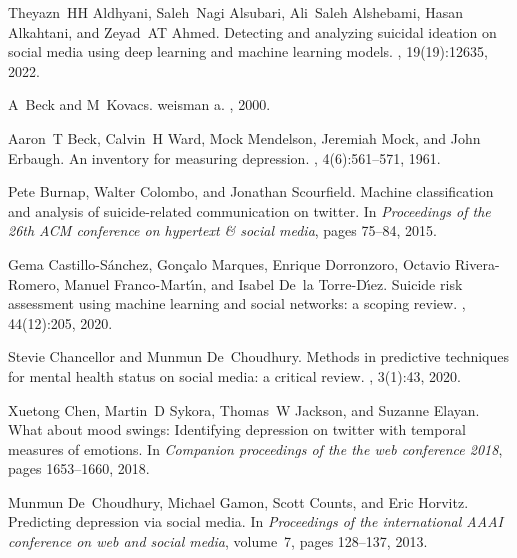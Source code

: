 \begin{thebibliography}{10}

Theyazn~HH Aldhyani, Saleh~Nagi Alsubari, Ali~Saleh Alshebami, Hasan Alkahtani,
  and Zeyad~AT Ahmed.
\newblock Detecting and analyzing suicidal ideation on social media using deep
  learning and machine learning models.
, 19(19):12635, 2022.

A~Beck and M~Kovacs.
\newblock weisman a.
, 2000.

Aaron~T Beck, Calvin~H Ward, Mock Mendelson, Jeremiah Mock, and John Erbaugh.
\newblock An inventory for measuring depression.
, 4(6):561--571, 1961.

Pete Burnap, Walter Colombo, and Jonathan Scourfield.
\newblock Machine classification and analysis of suicide-related communication
  on twitter.
\newblock In {\em Proceedings of the 26th ACM conference on hypertext \& social
  media}, pages 75--84, 2015.

Gema Castillo-S{\'a}nchez, Gon{\c{c}}alo Marques, Enrique Dorronzoro, Octavio
  Rivera-Romero, Manuel Franco-Mart{\'\i}n, and Isabel De~la Torre-D{\'\i}ez.
\newblock Suicide risk assessment using machine learning and social networks: a
  scoping review.
, 44(12):205, 2020.

Stevie Chancellor and Munmun De~Choudhury.
\newblock Methods in predictive techniques for mental health status on social
  media: a critical review.
, 3(1):43, 2020.

Xuetong Chen, Martin~D Sykora, Thomas~W Jackson, and Suzanne Elayan.
\newblock What about mood swings: Identifying depression on twitter with
  temporal measures of emotions.
\newblock In {\em Companion proceedings of the the web conference 2018}, pages
  1653--1660, 2018.

Munmun De~Choudhury, Michael Gamon, Scott Counts, and Eric Horvitz.
\newblock Predicting depression via social media.
\newblock In {\em Proceedings of the international AAAI conference on web and
  social media}, volume~7, pages 128--137, 2013.


\end{thebibliography}
